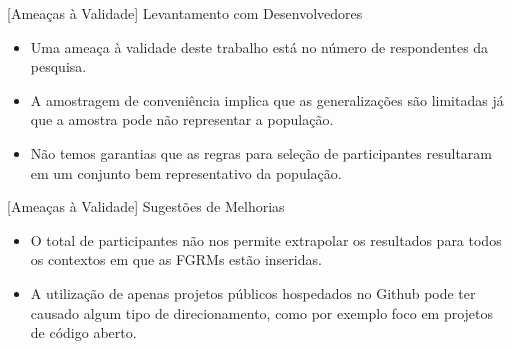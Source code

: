 \documentclass[t,14pt,mathserif]{beamer}
\begin{document}
\begin{frame}{[Ameaças à Validade] Levantamento com Desenvolvedores}

    \begin{itemize}

        \item Uma ameaça à validade deste trabalho está no número de
              respondentes da pesquisa.

        \item A amostragem de conveniência implica que as generalizações são
              limitadas já que a amostra pode não representar a população.

        \item Não temos garantias que as regras para seleção de participantes
              resultaram em um conjunto bem representativo da população.

     \end{itemize}

\end{frame}

\begin{frame}{[Ameaças à Validade] Sugestões de Melhorias}

    \begin{itemize}

        \item O total de participantes não nos permite extrapolar os resultados
            para todos os contextos em que as FGRMs estão inseridas.

        \item A utilização de apenas projetos públicos hospedados no Github
            pode ter causado algum tipo de direcionamento, como por exemplo
            foco em projetos de código aberto.

    \end{itemize}

\end{frame}
\end{document}
